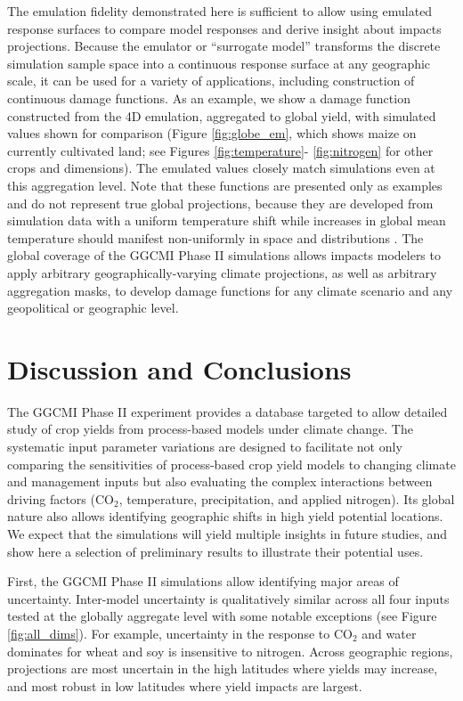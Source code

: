\documentclass[esd, final]{copernicus} %
\begin{document}
The emulation fidelity demonstrated here is sufficient to allow using emulated response surfaces to compare model responses and derive insight about impacts projections. Because the emulator or ``surrogate model'' transforms the discrete simulation sample space into a continuous response surface at any geographic scale, it can be used for a variety of applications, including construction of continuous damage functions. As an example, we show a damage function constructed from the 4D emulation, aggregated to global yield, with simulated values shown for comparison (Figure \ref{fig:globe_em}, which shows maize on currently cultivated land; see Figures \ref{fig:temperature}- \ref{fig:nitrogen} for other crops and dimensions). The emulated values closely match simulations even at this aggregation level. Note that these functions are presented only as examples and do not represent true global projections, because they are developed from simulation data with a uniform temperature shift while increases in global mean temperature should manifest non-uniformly in space and distributions \citep{Sippel2015}. The global coverage of the GGCMI Phase II simulations allows impacts modelers to apply arbitrary geographically-varying climate projections, as well as arbitrary aggregation masks, to develop damage functions for any climate scenario and any geopolitical or geographic level.

\section{Discussion and Conclusions} 
\label{S:6}
The GGCMI Phase II experiment provides a database targeted to allow detailed study of crop yields from process-based models under climate change. The systematic input parameter variations are designed to facilitate not only comparing the sensitivities of process-based crop yield models to changing climate and management inputs but also evaluating the complex interactions between driving factors (CO$_2$, temperature, precipitation, and applied nitrogen). Its global nature also allows identifying geographic shifts in high yield potential locations. We expect that the simulations will yield multiple insights in future studies, and show here a selection of preliminary results to illustrate their potential uses. 

First, the GGCMI Phase II simulations allow identifying major areas of uncertainty. Inter-model uncertainty is qualitatively similar across all four inputs tested at the globally aggregate level with some notable exceptions (see Figure \ref{fig:all_dims}). For example, uncertainty in the response to CO$_2$ and water dominates for wheat and soy is insensitive to nitrogen. Across geographic regions, projections are most uncertain in the high latitudes where yields may increase, and most robust in low latitudes where yield impacts are largest.
\end{document}
